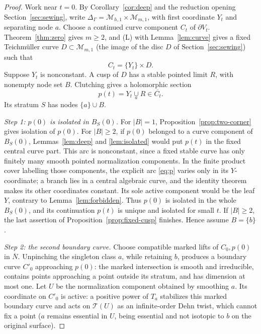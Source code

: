 \documentclass[11pt]{article}
\newcommand{\M}{\mathcal M}
\newcommand{\T}{\mathcal T}
\newcommand{\cl}[1]{\overline{#1}}
\theoremstyle{remark}
\begin{document}
\begin{proof}
Work near \(t=0\). By Corollary~\ref{cor:deep} and the reduction
opening Section~\ref{sec:sewing}, write
\(\Delta_\Gamma=\M_{h,1}\times\M_{m,1}\), with first
coordinate \(Y_t\) and separating node \(a\). Choose a continued curve
component \(C_t\) of \(\partial V_t\). Theorem~\ref{thm:zero} gives
\(m\ge2\), and (L) with Lemma~\ref{lem:curve} gives a fixed
Teichm\"uller curve \(D\subset\M_{m,1}\) (the image of the disc
\(D\) of Section~\ref{sec:sewing}) such that
\begin{equation}\label{eq:Ct}
 C_t=\{Y_t\}\times D.
\end{equation}
Suppose \(Y_t\) is nonconstant. A cusp of \(D\) has a stable
pointed limit \(R\), with nonempty node set \(B\). Clutching
gives a holomorphic section
\begin{equation}\label{eq:p}
 p(t)=Y_t\underset a\cup R\in\cl{C_t}.
\end{equation}
Its stratum \(S\) has nodes \(\{a\}\cup B\).

\emph{Step 1: \(p(0)\) is isolated in \(B_S(0)\).}
For \(|B|=1\), Proposition~\ref{prop:two-corner} gives
isolation of \(p(0)\). For \(|B|\ge2\), if \(p(0)\) belonged
to a curve component of \(B_S(0)\),
Lemmas~\ref{lem:deep} and \ref{lem:isolated} would put
\(p(t)\) in the fixed central curve part. This arc is
nonconstant, since a fixed stable curve has only finitely
many smooth pointed normalization components. In the finite
product cover labelling those components, the explicit arc
\eqref{eq:p} varies only in its \(Y\)-coordinate; a branch lies
in a central algebraic curve, and the identity theorem makes its
other coordinates constant. Its sole active component would be the
leaf \(Y\), contrary to Lemma~\ref{lem:forbidden}.
Thus \(p(0)\) is isolated in the whole \(B_S(0)\), and its
continuation \(p(t)\) is unique and isolated for small
\(t\). If \(|B|\ge2\), the last assertion of
Proposition~\ref{prop:fixed-cusp} finishes. Hence assume \(B=\{b\}\).

\emph{Step 2: the second boundary curve.}
Choose compatible marked lifts of \(C_0,p(0)\) in \(\cl N\).
Unpinching the singleton class \(a\), while retaining \(b\),
produces a boundary curve \(C'_0\) approaching \(p(0)\):
the marked intersection is smooth and irreducible,
contains points approaching a point outside its stratum,
and has dimension at most one. Let \(U\) be the normalization
component obtained by smoothing \(a\). Its coordinate on
\(C'_0\) is active: a positive power of \(T_a\) stabilizes
this marked boundary curve and acts on \(\T(U)\) as an
infinite-order Dehn twist, which cannot fix a point
(\(a\) remains essential in \(U\), being essential and
not isotopic to \(b\) on the original surface).


\end{proof}
\end{document}
